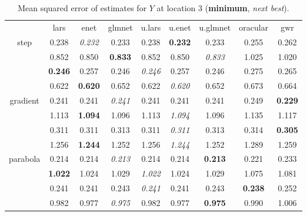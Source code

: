 \documentclass[authoryear, review, 11pt]{elsarticle}
\begin{document}
\begin{table}[ht]
\begin{center}
\begin{tabular}{ccccccccc}
  & lars & enet & glmnet & u.lars & u.enet & u.glmnet & oracular & gwr \\ 
  \cline{2-9}
  \multirow{4}{*}{step} & 0.238 & \emph{0.232} & 0.233 & 0.238 & \textbf{0.232} & 0.233 & 0.255 & 0.262 \\ 
  & 0.852 & 0.850 & \textbf{0.833} & 0.852 & 0.850 & \emph{0.833} & 1.025 & 1.020 \\ 
  & \textbf{0.246} & 0.257 & 0.246 & \emph{0.246} & 0.257 & 0.246 & 0.275 & 0.265 \\ 
  & 0.622 & \textbf{0.620} & 0.652 & 0.622 & \emph{0.620} & 0.652 & 0.673 & 0.664 \\ 
  \cline{2-9}
  \multirow{4}{*}{gradient} & 0.241 & 0.241 & \emph{0.241} & 0.241 & 0.241 & 0.241 & 0.249 & \textbf{0.229} \\ 
  & 1.113 & \textbf{1.094} & 1.096 & 1.113 & \emph{1.094} & 1.096 & 1.135 & 1.117 \\ 
  & 0.311 & 0.311 & 0.313 & 0.311 & \emph{0.311} & 0.313 & 0.314 & \textbf{0.305} \\ 
  & 1.256 & \textbf{1.244} & 1.252 & 1.256 & \emph{1.244} & 1.252 & 1.289 & 1.259 \\ 
  \cline{2-9}
  \multirow{4}{*}{parabola} & 0.214 & 0.214 & \emph{0.213} & 0.214 & 0.214 & \textbf{0.213} & 0.221 & 0.233 \\ 
  & \textbf{1.022} & 1.024 & 1.029 & \emph{1.022} & 1.024 & 1.029 & 1.075 & 1.081 \\ 
  & 0.241 & 0.241 & 0.243 & \emph{0.241} & 0.241 & 0.243 & \textbf{0.238} & 0.252 \\ 
  & 0.982 & 0.977 & \emph{0.975} & 0.982 & 0.977 & \textbf{0.975} & 0.990 & 1.006 \\ 
  \end{tabular}
\caption{Mean squared error of estimates for $Y$ at location 3 (\textbf{minimum}, \emph{next best}).\label{table:loc3-MSEY}}
\end{center}
\end{table}
\end{document}
